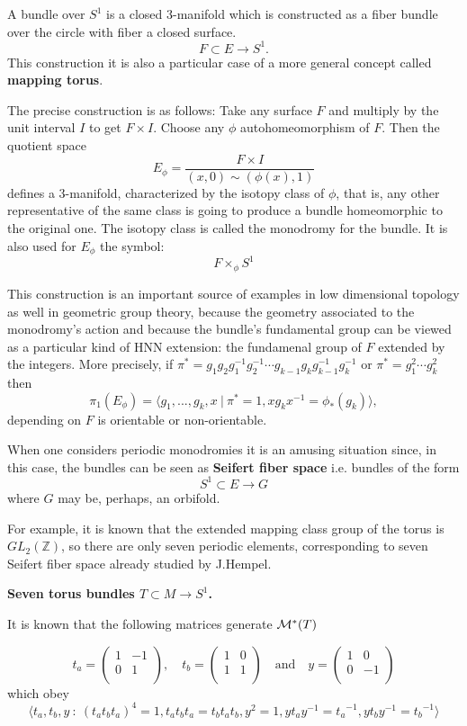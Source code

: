 \documentclass[12pt]{article}
\begin{document}
A \emph{} bundle over $S^1$ is a closed 3-manifold which is constructed as a fiber bundle over the circle with fiber a closed surface.
$$F\subset E\to S^1.$$
This construction it is also a particular case of a more general concept called {\bf mapping torus}.

The precise construction is as follows: Take any surface $F$ and multiply by the unit interval $I$ to get $F\times I$. Choose any $\phi$ autohomeomorphism of $F$.
Then the quotient space
$$E_{\phi}=\frac{F\times I}{(x,0)\sim(\phi(x),1)}$$
defines a 3-manifold, characterized by the isotopy class of $\phi$, that is, any other representative of the same class is going to produce a bundle homeomorphic to the original one. The isotopy class is called the monodromy for the bundle. It is also used for $E_{\phi}$ the symbol:
$$F\times _{\phi}S^1$$

This construction is an important source of examples in low dimensional topology as well in geometric group theory, because the geometry associated to the monodromy's action and because the bundle's fundamental group can be viewed as a particular kind of HNN extension: the fundamenal group of $F$ extended by the integers. More precisely, if $\pi^*=g_1g_2g_1^{-1}g_2^{-1}\cdots g_{k-1}g_{k}g_{k-1}^{-1}g_{k}^{-1}$ or $\pi^*=g_1^2\cdots g_k^2$ then
$$\pi_1(E_{\phi})=\langle g_1,...,g_k,x\ |\ \pi^*=1, xg_k x^{-1}=\phi_*(g_k)\rangle,$$
depending on $F$ is orientable or non-orientable.

When one considers periodic monodromies it is an amusing situation since, in this case, the bundles can be seen as {\bf Seifert fiber space} i.e. bundles of the form
$$S^1\subset E\to G$$
where $G$  may be, perhaps, an orbifold.  

For example, it is known that the extended mapping class group of the torus is $GL_2({\mathbb{Z}})$, so there are only seven periodic elements, corresponding to seven Seifert fiber space already studied by J.Hempel.  
  
\centerline{\bf Seven torus bundles $T\subset M\to S^1$.}
 
It is known that the following matrices generate ${\cal{M}}^*(T)$ 

$$t_a
=\left(\begin{array}{cc}
1 & -1 \\
0 & 1 \\  
\end{array}\right)
,\quad 
t_b
=\left(\begin{array}{cc}
1 & 0 \\
1 & 1 \\  
\end{array}\right)
\quad
\mbox{and}\quad
y=
\left(\begin{array}{cc}
1 & 0 \\
0 & -1 \\  
\end{array}\right)
$$ 
which obey  
$$\langle t_a,t_b,y\ :\ (t_at_bt_a)^4=1,t_at_bt_a=t_bt_at_b,y^2=1,yt_ay^{-1}={t_a}^{-1},
yt_by^{-1}={t_b}^{-1}\rangle$$
\end{document}

